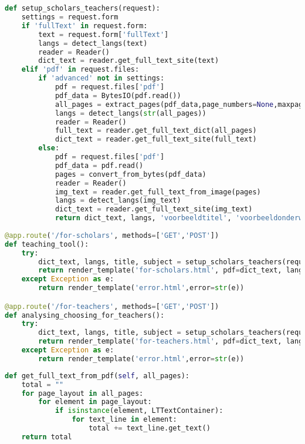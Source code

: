 \chapter{}%
\label{ch:bijlage-code-2}

\begin{lstlisting}[language=Python, caption={Koppeling tussen front-end en back-end voor het inlezen van een wetenschappelijk artikel}, label={code:inlezen-wetenschappelijk-artikel-front-end-back-end}]
def setup_scholars_teachers(request):
	settings = request.form
	if 'fullText' in request.form:
		text = request.form['fullText']
		langs = detect_langs(text)
		reader = Reader()
		dict_text = reader.get_full_text_site(text)                
	elif 'pdf' in request.files:
		if 'advanced' not in settings:
			pdf = request.files['pdf']
			pdf_data = BytesIO(pdf.read())
			all_pages = extract_pages(pdf_data,page_numbers=None,maxpages=999)
			langs = detect_langs(str(all_pages))
			reader = Reader()
			full_text = reader.get_full_text_dict(all_pages)
			dict_text = reader.get_full_text_site(full_text)
		else:
			pdf = request.files['pdf']
			pdf_data = pdf.read()
			pages = convert_from_bytes(pdf_data)
			reader = Reader()
			img_text = reader.get_full_text_from_image(pages)
			langs = detect_langs(img_text)
			dict_text = reader.get_full_text_site(img_text)                            
			return dict_text, langs, 'voorbeeldtitel', 'voorbeeldonderwerp'
			
@app.route('/for-scholars', methods=['GET','POST'])
def teaching_tool():
	try:
		dict_text, langs, title, subject = setup_scholars_teachers(request)
		return render_template('for-scholars.html', pdf=dict_text, lang=langs, title=title, subject=subject)
	except Exception as e:
		return render_template('error.html',error=str(e))

@app.route('/for-teachers', methods=['GET','POST'])
def analysing_choosing_for_teachers():
	try:
		dict_text, langs, title, subject = setup_scholars_teachers(request)
		return render_template('for-teachers.html', pdf=dict_text, lang=langs, title=title, subject=subject)
	except Exception as e:
		return render_template('error.html',error=str(e))
\end{lstlisting}

\newpage

\begin{lstlisting}[language=Python, caption={Een PDF inlezen met PDFMiner}, label={code:inlezen-van-pdf}]
def get_full_text_from_pdf(self, all_pages):
	total = ""
	for page_layout in all_pages:
		for element in page_layout:
			if isinstance(element, LTTextContainer):
				for text_line in element:
					total += text_line.get_text()
	return total
\end{lstlisting}

